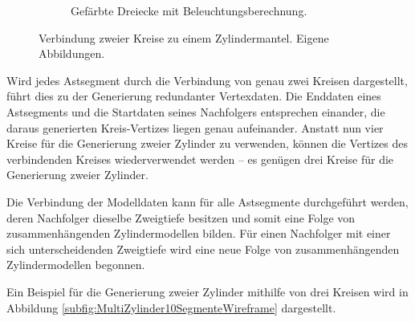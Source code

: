 \begin{figure} [hbtp]
\begin{subfigure}[t]{.4\textwidth}
	\caption{Gefärbte Dreiecke mit Beleuchtungsberechnung.}
	\label{subfig:Zylinder10SegmenteOpaque}
\end{subfigure}
\caption{Verbindung zweier Kreise zu einem Zylindermantel. Eigene Abbildungen.}
\label{fig:Zylinder10Segmente}
\end{figure}

Wird jedes Astsegment durch die Verbindung von genau zwei Kreisen dargestellt, führt dies zu der Generierung redundanter Vertexdaten. Die Enddaten eines Astsegments und die Startdaten seines Nachfolgers entsprechen einander, die daraus generierten Kreis-Vertizes liegen genau aufeinander. Anstatt nun vier Kreise für die Generierung zweier Zylinder zu verwenden, können die Vertizes des verbindenden Kreises wiederverwendet werden -- es genügen drei Kreise für die Generierung zweier Zylinder.

Die Verbindung der Modelldaten kann für alle Astsegmente durchgeführt werden, deren Nachfolger dieselbe Zweigtiefe besitzen und somit eine Folge von zusammenhängenden Zylindermodellen bilden. Für einen Nachfolger mit einer sich unterscheidenden Zweigtiefe wird eine neue Folge von zusammenhängenden Zylindermodellen begonnen. \cite{ModelingByNumbersZylindersA:13}

Ein Beispiel für die Generierung zweier Zylinder mithilfe von drei Kreisen wird in Abbildung \ref{subfig:MultiZylinder10SegmenteWireframe} dargestellt.

